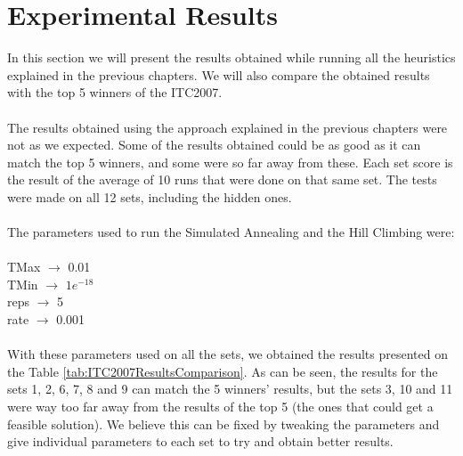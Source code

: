 \chapter{Experimental Results}
\label{sec:ExpResults}

In this section we will present the results obtained while running all the heuristics explained in the previous chapters. We will also compare the obtained results with the top 5 winners of the ITC2007.\\
\\
The results obtained using the approach explained in the previous chapters were not as we expected. Some of the results obtained could be as good as it can match the top 5 winners, and some were so far away from these. Each set score is the result of the average of 10 runs that were done on that same set. The tests were made on all 12 sets, including the hidden ones.\\
\\
The parameters used to run the Simulated Annealing and the Hill Climbing were:\\
\\
TMax $\rightarrow$ 0.01\\
TMin $\rightarrow$ $1e^{-18}$\\
reps $\rightarrow$ 5\\
rate $\rightarrow$ 0.001\\
\\
With these parameters used on all the sets, we obtained the results presented on the Table \ref{tab:ITC2007ResultsComparison}. As can be seen, the results for the sets 1, 2, 6, 7, 8 and 9 can match the 5 winners' results, but the sets 3, 10 and 11 were way too far away from the results of the top 5 (the ones that could get a feasible solution). We believe this can be fixed by tweaking the parameters and give individual parameters to each set to try and obtain better results.\\
\\
